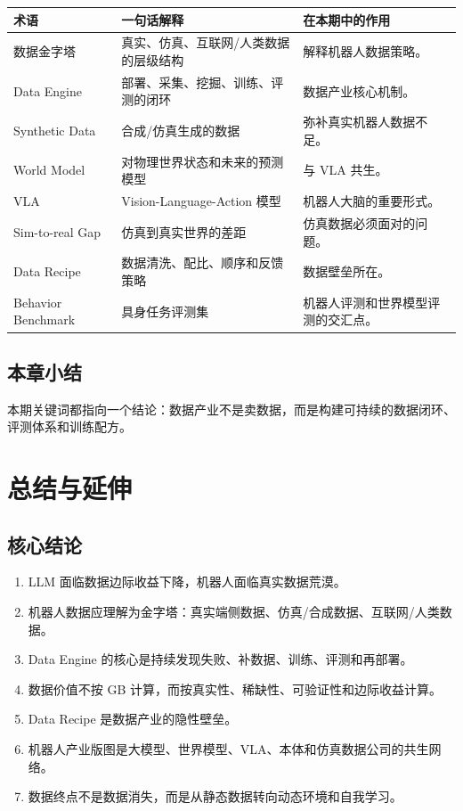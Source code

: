 \documentclass[a4paper]{article}
\begin{document}
\begin{longtable}{p{}p{}p{}}
\toprule
术语 & 一句话解释 & 在本期中的作用 \\
\midrule
数据金字塔 & 真实、仿真、互联网/人类数据的层级结构 & 解释机器人数据策略。 \\
Data Engine & 部署、采集、挖掘、训练、评测的闭环 & 数据产业核心机制。 \\
Synthetic Data & 合成/仿真生成的数据 & 弥补真实机器人数据不足。 \\
World Model & 对物理世界状态和未来的预测模型 & 与 VLA 共生。 \\
VLA & Vision-Language-Action 模型 & 机器人大脑的重要形式。 \\
Sim-to-real Gap & 仿真到真实世界的差距 & 仿真数据必须面对的问题。 \\
Data Recipe & 数据清洗、配比、顺序和反馈策略 & 数据壁垒所在。 \\
Behavior Benchmark & 具身任务评测集 & 机器人评测和世界模型评测的交汇点。 \\
\bottomrule
\end{longtable}

\subsection{本章小结}

本期关键词都指向一个结论：数据产业不是卖数据，而是构建可持续的数据闭环、评测体系和训练配方。

\section{总结与延伸}

\subsection{核心结论}

\begin{enumerate}
\item LLM 面临数据边际收益下降，机器人面临真实数据荒漠。
\item 机器人数据应理解为金字塔：真实端侧数据、仿真/合成数据、互联网/人类数据。
\item Data Engine 的核心是持续发现失败、补数据、训练、评测和再部署。
\item 数据价值不按 GB 计算，而按真实性、稀缺性、可验证性和边际收益计算。
\item Data Recipe 是数据产业的隐性壁垒。
\item 机器人产业版图是大模型、世界模型、VLA、本体和仿真数据公司的共生网络。
\item 数据终点不是数据消失，而是从静态数据转向动态环境和自我学习。
\end{enumerate}
\end{document}

